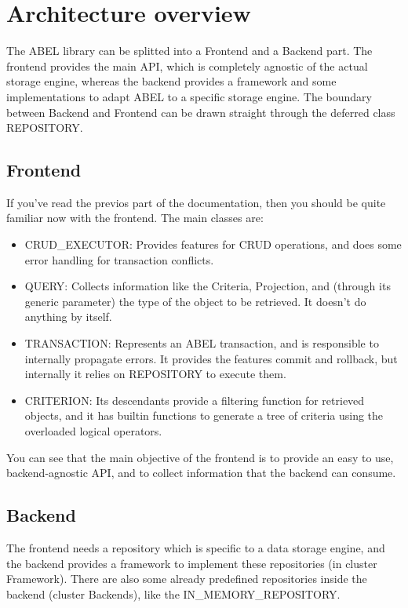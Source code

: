 \section{Architecture overview}

The ABEL library can be splitted into a Frontend and a Backend part.
The frontend provides the main API, which is completely agnostic of the actual storage engine, 
whereas the backend provides a framework and some implementations to adapt ABEL to a specific storage engine.
The boundary between Backend and Frontend can be drawn straight through the deferred class REPOSITORY.

\subsection{Frontend}

If you've read the previos part of the documentation, then you should be quite familiar now with the frontend.
The main classes are:
 \begin{itemize}
  \item CRUD\_EXECUTOR: Provides features for CRUD operations, and does some error handling for transaction conflicts.
  \item QUERY: Collects information like the Criteria, Projection, and (through its generic parameter) the type of the object to be retrieved. It doesn't do anything by itself.
  \item TRANSACTION: Represents an ABEL transaction, and is responsible to internally propagate errors. It provides the features commit and rollback, but internally it relies on REPOSITORY to execute them.
  \item CRITERION: Its descendants provide a filtering function for retrieved objects, and it has builtin functions to generate a tree of criteria using the overloaded logical operators.
 \end{itemize}

You can see that the main objective of the frontend is to provide an easy to use, backend-agnostic API, and to collect information that the backend can consume.



\subsection{Backend}

The frontend needs a repository which is specific to a data storage engine, and the backend provides a framework to implement these repositories (in cluster Framework).
There are also some already predefined repositories inside the backend (cluster Backends), like the IN\_MEMORY\_REPOSITORY.

